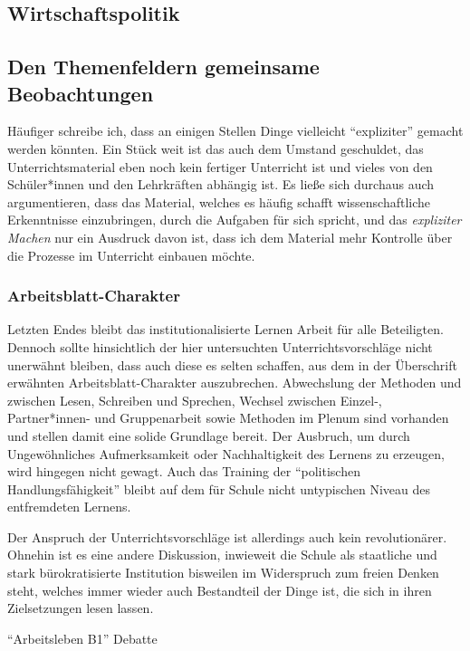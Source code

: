 \subsection{Wirtschaftspolitik} %



\subsection{Den Themenfeldern gemeinsame Beobachtungen}
Häufiger schreibe ich, dass an einigen Stellen Dinge vielleicht \enquote{expliziter} gemacht werden könnten. Ein Stück weit ist das auch dem Umstand geschuldet, das Unterrichtsmaterial eben noch kein fertiger Unterricht ist und vieles von den Schüler*innen und den Lehrkräften abhängig ist. Es ließe sich durchaus auch argumentieren, dass das Material, welches es häufig schafft wissenschaftliche Erkenntnisse einzubringen, durch die Aufgaben für sich spricht, und das \emph{expliziter Machen} nur ein Ausdruck davon ist, dass ich dem Material mehr Kontrolle über die Prozesse im Unterricht einbauen möchte. 


\subsubsection{Arbeitsblatt-Charakter}
Letzten Endes bleibt das institutionalisierte Lernen Arbeit für alle Beteiligten. Dennoch sollte hinsichtlich der hier untersuchten Unterrichtsvorschläge nicht unerwähnt bleiben, dass auch diese es selten schaffen, aus dem in der Überschrift erwähnten Arbeitsblatt-Charakter auszubrechen. Abwechslung der Methoden und zwischen Lesen, Schreiben und Sprechen, Wechsel zwischen Einzel-, Partner*innen- und Gruppenarbeit sowie Methoden im Plenum sind vorhanden und stellen damit eine solide Grundlage bereit. Der Ausbruch, um durch Ungewöhnliches Aufmerksamkeit oder Nachhaltigkeit des Lernens zu erzeugen, wird hingegen nicht gewagt. 
Auch das Training der \enquote{politischen Handlungsfähigkeit} bleibt auf dem für Schule nicht untypischen Niveau des entfremdeten Lernens. 

Der Anspruch der Unterrichtsvorschläge ist allerdings auch kein revolutionärer. Ohnehin ist es eine andere Diskussion, inwieweit die Schule als staatliche und stark bürokratisierte Institution bisweilen im Widerspruch zum freien Denken steht, welches immer wieder auch Bestandteil der Dinge ist, die sich in ihren Zielsetzungen lesen lassen. 

\enquote{Arbeitsleben B1} Debatte

